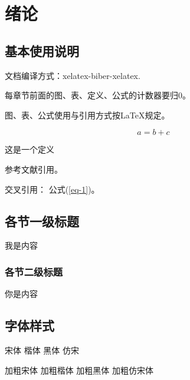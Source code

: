 \pagestyle{fancy}
\fancyhead{} %
\fancyfoot[C]{\thepage}%
\renewcommand{\headrulewidth}{1pt} %
\renewcommand{\footrulewidth}{0pt}

\section{绪论}
\setcounter{subsection}{0} 
\setcounter{table}{0} \setcounter{figure}{0} \setcounter{equation}{0} \setcounter{definition}{0}

\subsection{基本使用说明}
文档编译方式：xelatex-biber-xelatex.

每章节前面的图、表、定义、公式的计数器要归0。

图、表、公式使用与引用方式按\LaTeX 规定。

\begin{equation}
    a=b+c \label{eq-1}
\end{equation}

\begin{definition}
    这是一个定义
\end{definition}

参考文献引用\cite{kai1979prospect}。

交叉引用： 公式(\ref{eq-1})。

\subsection{各节一级标题}
我是内容

\subsubsection{各节二级标题}
你是内容


\subsection{字体样式}

{\song 宋体 \kai 楷体 \hei 黑体 \fs 仿宋}

{\tbf 加粗宋体 \kaitib 加粗楷体 \heitib 加粗黑体 \fangsongti 加粗仿宋体}

\newpage